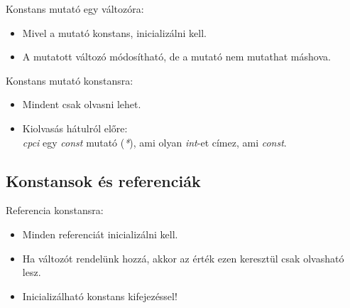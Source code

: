 \begin{frame}
    Konstans mutató egy változóra:
    \begin{itemize}
        \item Mivel a mutató konstans, inicializálni kell.
        \item A mutatott változó módosítható, de a mutató nem mutathat máshova.
    \end{itemize}
    \begin{exampleblock}{}
        \scriptsize
        
    \end{exampleblock}
\end{frame}

\begin{frame}
    Konstans mutató konstansra:
    \begin{itemize}
        \item Mindent csak olvasni lehet.
        \item Kiolvasás hátulról előre:\\ \emph{cpci} egy \emph{const} mutató (\emph{*}), ami olyan \emph{int}-et címez, ami \emph{const}.
    \end{itemize}
    \begin{exampleblock}{}
        \scriptsize
        
    \end{exampleblock}
\end{frame}

\subsection{Konstansok és referenciák}

\begin{frame}
    Referencia konstansra:
    \begin{itemize}
        \item Minden referenciát inicializálni kell.
        \item Ha változót rendelünk hozzá, akkor az érték ezen keresztül csak olvasható lesz.
        \item Inicializálható konstans kifejezéssel!
    \end{itemize}
    \begin{exampleblock}{}
        \scriptsize
        
    \end{exampleblock}
\end{frame}

